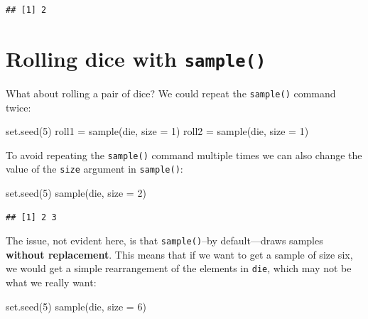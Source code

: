 \documentclass[
]{book}
\newenvironment{Shaded}{\begin{snugshade}}{\end{snugshade}}
\newcommand{\AttributeTok}[1]{\textcolor[rgb]{0.77,0.63,0.00}{#1}}
\newcommand{\DecValTok}[1]{\textcolor[rgb]{0.00,0.00,0.81}{#1}}
\newcommand{\FunctionTok}[1]{\textcolor[rgb]{0.00,0.00,0.00}{#1}}
\newcommand{\NormalTok}[1]{#1}
\newcommand{\OtherTok}[1]{\textcolor[rgb]{0.56,0.35,0.01}{#1}}
\begin{document}
\begin{verbatim}
## [1] 2
\end{verbatim}

\hypertarget{rolling-dice-with-sample}{%
\section{\texorpdfstring{Rolling dice with \texttt{sample()}}{Rolling dice with sample()}}\label{rolling-dice-with-sample}}

What about rolling a pair of dice? We could repeat the \texttt{sample()} command
twice:

\begin{Shaded}
\begin{Highlighting}[]
\FunctionTok{set.seed}\NormalTok{(}\DecValTok{5}\NormalTok{)}
\NormalTok{roll1 }\OtherTok{=} \FunctionTok{sample}\NormalTok{(die, }\AttributeTok{size =} \DecValTok{1}\NormalTok{)}
\NormalTok{roll2 }\OtherTok{=} \FunctionTok{sample}\NormalTok{(die, }\AttributeTok{size =} \DecValTok{1}\NormalTok{)}
\end{Highlighting}
\end{Shaded}

To avoid repeating the \texttt{sample()} command multiple times we can also change the
value of the \texttt{size} argument in \texttt{sample()}:

\begin{Shaded}
\begin{Highlighting}[]
\FunctionTok{set.seed}\NormalTok{(}\DecValTok{5}\NormalTok{)}
\FunctionTok{sample}\NormalTok{(die, }\AttributeTok{size =} \DecValTok{2}\NormalTok{)}
\end{Highlighting}
\end{Shaded}

\begin{verbatim}
## [1] 2 3
\end{verbatim}

The issue, not evident here, is that \texttt{sample()}--by default---draws samples
\textbf{without replacement}. This means that if we want to get a sample of size
six, we would get a simple rearrangement of the elements in \texttt{die}, which may
not be what we really want:

\begin{Shaded}
\begin{Highlighting}[]
\FunctionTok{set.seed}\NormalTok{(}\DecValTok{5}\NormalTok{)}
\FunctionTok{sample}\NormalTok{(die, }\AttributeTok{size =} \DecValTok{6}\NormalTok{)}
\end{Highlighting}
\end{Shaded}
\end{document}
